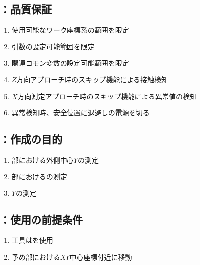 \clearpage
\subsection{\MXOThickness：品質保証}
\begin{enumerate}[label*=\sarrow]
\item 使用可能なワーク座標系の範囲を限定
\item {}引数の設定可能範囲を限定
\item 関連コモン変数の設定可能範囲を限定
\item $Z$方向アプローチ時のスキップ機能による接触検知
\item $X$方向測定アプローチ時のスキップ機能による異常値の検知
\item 異常検知時、安全位置に退避し\TouchSensorProbe の電源を切る
\end{enumerate}



\clearpage


\subsection{\MYOThickness：作成の目的}
\begin{enumerate}[label*=\sarrow]
\item \EndFace 部における外側中心$Y$の測定
\item \EndFace 部における\BDOD の測定
\item \KeywayCenter$Y$の測定
\end{enumerate}


\subsection{\MYOThickness：使用の前提条件}
\begin{enumerate}[label*=\sarrow]
\item 工具は\TouchSensorProbe を使用
\item 予め\EndFace 部における$XY$中心座標付近に移動
\end{enumerate}


